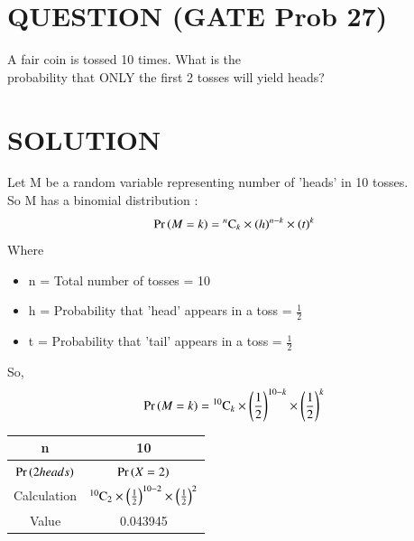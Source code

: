 \documentclass[journal,12pt,twocolumn]{IEEEtran}
\begin{document}
\section*{QUESTION (GATE Prob 27)}
A fair coin is tossed 10 times. What is the \\probability that ONLY the first 2 tosses will yield heads?
\section*{SOLUTION}
Let M be a random variable representing number of 'heads' in 10 tosses.\\
So M has a binomial distribution :
\begin{align}
    \Pr\left(M=k\right) = {}^{n}\mathrm{C}_{k} \times (h)^{n-k} \times (t)^{k}\label{0.0.1}
\end{align}
Where
\begin{itemize}
    \item n = Total number of tosses = 10
    \item h = Probability that 'head' appears in a toss = \( \frac{1}{2} \)
    \item t = Probability that 'tail' appears in a toss = \( \frac{1}{2} \)
\end{itemize}
\bigskip
So,
\begin{align}
    \Pr\left(M=k\right) = {}^{10}\mathrm{C}_{k} \times \left(\frac{1}{2}\right)^{10-k} \times \left(\frac{1}{2}\right)^{k}\label{0.0.2}
\end{align}
\begin{table}[h]
    \begin{center}
        \resizebox{7cm}{!}
        {
            \begin{tabular}{|c|c|}
                \hline
                n           & 10                                                                            \\
                \hline
                $\Pr\left(2 heads\right)$  & $\Pr\left(X = 2\right)$                                                                    \\
                \hline
                Calculation & ${}^{10}\mathrm{C}_{2} \times \left(\frac{1}{2}\right)^{10-2} \times \left(\frac{1}{2}\right)^{2}$ \\
                \hline
                Value       & 0.043945                                                                      \\
                \hline
            \end{tabular}
        }
    \end{center}
\end{table}
\end{document}
